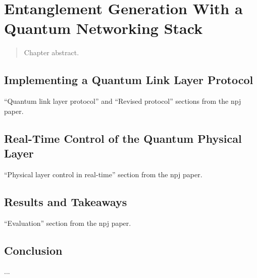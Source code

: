 \chapter{Entanglement Generation With a Quantum Networking Stack}
\label{chp:netstack}

\begin{abstract}
Chapter abstract.
\end{abstract}


\newpage


\section{Implementing a Quantum Link Layer Protocol}

``Quantum link layer protocol'' and ``Revised protocol'' sections from the npj paper.

\section{Real-Time Control of the Quantum Physical Layer}

``Physical layer control in real-time'' section from the npj paper.

\section{Results and Takeaways}

``Evaluation'' section from the npj paper.

\section{Conclusion}

...

\printbibliography[heading=subbibintoc,title={References}]
